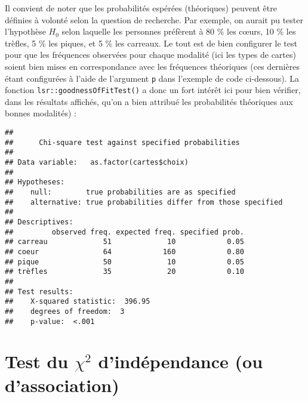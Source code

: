 \documentclass[
]{book}
\newenvironment{Shaded}{\begin{snugshade}}{\end{snugshade}}
\newcommand{\AttributeTok}[1]{\textcolor[rgb]{0.77,0.63,0.00}{#1}}
\newcommand{\FloatTok}[1]{\textcolor[rgb]{0.00,0.00,0.81}{#1}}
\newcommand{\FunctionTok}[1]{\textcolor[rgb]{0.00,0.00,0.00}{#1}}
\newcommand{\NormalTok}[1]{#1}
\newcommand{\SpecialCharTok}[1]{\textcolor[rgb]{0.00,0.00,0.00}{#1}}
\begin{document}
Il convient de noter que les probabilités espérées (théoriques) peuvent être définies à volonté selon la question de recherche. Par exemple, on aurait pu tester l'hypothèse \(H_{0}\) selon laquelle les personnes préfèrent à 80 \% les cœurs, 10 \% les trèfles, 5 \% les piques, et 5 \% les carreaux. Le tout est de bien configurer le test pour que les fréquences observées pour chaque modalité (ici les types de cartes) soient bien mises en correspondance avec les fréquences théoriques (ces dernières étant configurées à l'aide de l'argument \texttt{p} dans l'exemple de code ci-dessous). La fonction \texttt{lsr::goodnessOfFitTest()} a donc un fort intérêt ici pour bien vérifier, dans les résultats affichés, qu'on a bien attribué les probabilités théoriques aux bonnes modalités) :

\begin{Shaded}
\end{Shaded}

\begin{verbatim}
## 
##      Chi-square test against specified probabilities
## 
## Data variable:   as.factor(cartes$choix) 
## 
## Hypotheses: 
##    null:        true probabilities are as specified
##    alternative: true probabilities differ from those specified
## 
## Descriptives: 
##         observed freq. expected freq. specified prob.
## carreau             51             10            0.05
## coeur               64            160            0.80
## pique               50             10            0.05
## trèfles             35             20            0.10
## 
## Test results: 
##    X-squared statistic:  396.95 
##    degrees of freedom:  3 
##    p-value:  <.001
\end{verbatim}

\hypertarget{test-du-chi2-dinduxe9pendance-ou-dassociation}{%
\section{\texorpdfstring{Test du \(\chi^2\) d'indépendance (ou d'association)}{Test du \textbackslash chi\^{}2 d'indépendance (ou d'association)}}\label{test-du-chi2-dinduxe9pendance-ou-dassociation}}
\end{document}
